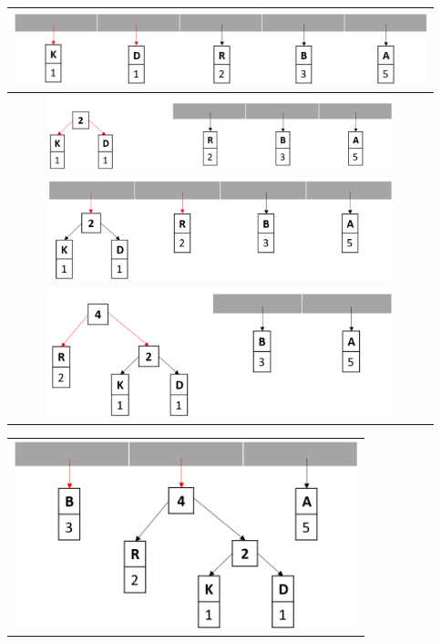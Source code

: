 \documentclass[course=erap]{aspdoc}
\begin{document}
\begin{enumerate}
\begin{table}[H]
        \centering
        \begin{tabular}{c}
            \toprule
            \includegraphics[width=12cm]{Abbildungen/Step0.png} \\
            \hline
            \includegraphics[width=10cm]{Abbildungen/Step1.png} \\
            \hline
            \includegraphics[width=10cm]{Abbildungen/Step2.png} \\
            \hline
            \includegraphics[width=10cm]{Abbildungen/Step3.png} \\
        \end{tabular}
\end{table}
\begin{table}[H]
        \centering
        \begin{tabular}{c}
            \includegraphics[width=10cm]{Abbildungen/Step4.png} \\

\end{tabular}
\end{table}
\end{enumerate}
\end{document}
